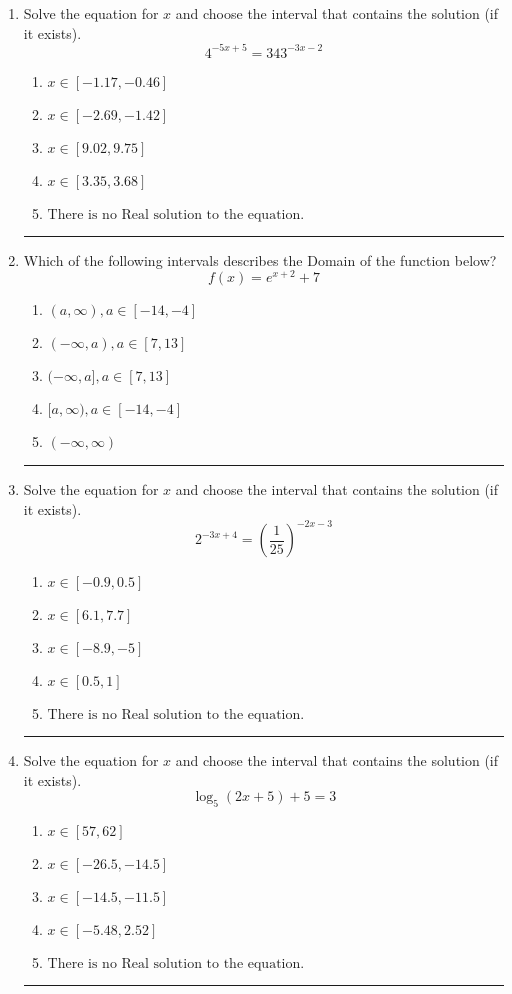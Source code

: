 \documentclass[14pt]{extbook}
\newcommand{\litem}[1]{\item#1\hspace*{-1cm}\rule{\textwidth}{0.4pt}}
\begin{document}
\begin{enumerate}
\litem{
Solve the equation for $x$ and choose the interval that contains the solution (if it exists).\[ 4^{-5x+5} = 343^{-3x-2} \]\begin{enumerate}[label=\Alph*.]
\item \( x \in [-1.17, -0.46] \)
\item \( x \in [-2.69, -1.42] \)
\item \( x \in [9.02, 9.75] \)
\item \( x \in [3.35, 3.68] \)
\item \( \text{There is no Real solution to the equation.} \)

\end{enumerate} }
\litem{
Which of the following intervals describes the Domain of the function below?\[ f(x) = e^{x+2}+7 \]\begin{enumerate}[label=\Alph*.]
\item \( (a, \infty), a \in [-14, -4] \)
\item \( (-\infty, a), a \in [7, 13] \)
\item \( (-\infty, a], a \in [7, 13] \)
\item \( [a, \infty), a \in [-14, -4] \)
\item \( (-\infty, \infty) \)

\end{enumerate} }
\litem{
Solve the equation for $x$ and choose the interval that contains the solution (if it exists).\[ 2^{-3x+4} = \left(\frac{1}{25}\right)^{-2x-3} \]\begin{enumerate}[label=\Alph*.]
\item \( x \in [-0.9, 0.5] \)
\item \( x \in [6.1, 7.7] \)
\item \( x \in [-8.9, -5] \)
\item \( x \in [0.5, 1] \)
\item \( \text{There is no Real solution to the equation.} \)

\end{enumerate} }
\litem{
Solve the equation for $x$ and choose the interval that contains the solution (if it exists).\[ \log_{5}{(2x+5)}+5 = 3 \]\begin{enumerate}[label=\Alph*.]
\item \( x \in [57, 62] \)
\item \( x \in [-26.5, -14.5] \)
\item \( x \in [-14.5, -11.5] \)
\item \( x \in [-5.48, 2.52] \)
\item \( \text{There is no Real solution to the equation.} \)


\end{enumerate}}
\end{enumerate}
\end{document}

